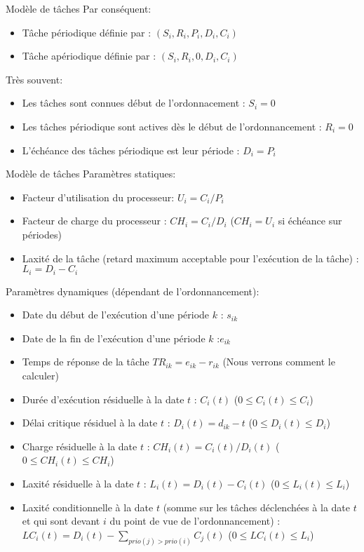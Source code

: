 \begin{frame}{Modèle de tâches}
  Par conséquent: 
  \begin{itemize} 
  \item Tâche périodique définie par : $(S_i, R_i, P_i ,D_i, C_i)$
  \item Tâche apériodique définie par : $(S_i, R_i, 0, D_i, C_i)$
  \end{itemize} 
  Très souvent:
  \begin{itemize}
    \item Les tâches sont connues début de l'ordonnacement : $S_i = 0$
    \item Les tâches périodique sont actives dès le début de
      l'ordonnancement : $R_i = 0$
    \item L'échéance des  tâches périodique est leur période  : $D_i =
      P_i$
  \end{itemize}
\end{frame}

\begin{frame}{Modèle de tâches}
  Paramètres statiques:
  \begin{itemize} 
  \item Facteur d'utilisation du processeur: $U_i =  C_i /P_i$
  \item Facteur de charge du processeur : $CH_i = C_i / D_i $ ($CH_i =
    U_i$ si échéance sur périodes)
  \item Laxité de la tâche (retard maximum acceptable pour l'exécution
    de la tâche) : $L_i = D_i - C_i$
  \end{itemize} 
  Paramètres dynamiques (dépendant de l'ordonnancement):
  \begin{itemize} 
  \item Date du début de l'exécution d'une période $k$ : $s_{ik}$
  \item Date de la fin de l'exécution d'une période $k$ :$e_{ik}$
  \item Temps de réponse de la tâche $TR_{ik} = e_{ik} - r_{ik}$ (Nous
    verrons comment le calculer)
  \item Durée d'exécution résiduelle à la date $t$ : $C_i(t)$ ($0 \leq
    C_i(t) \leq C_i$)
  \item Délai  critique résiduel à la  date $t$ :  $D_i(t) = d_{ik}-t$
    ($0 \leq D_i(t) \leq D_i$)
  \item Charge résiduelle à la date $t$ :
    $CH_i(t) = C_i(t) / D_i(t)$  ($0 \leq CH_i(t) \leq CH_i$)
  \item Laxité  résiduelle à la  date $t$ :
    $L_i(t) = D_i(t) - C_i(t)$  ($0  \leq L_i(t) \leq  L_i$)
  \item  Laxité conditionnelle  à la  date $t$  (somme sur  les tâches
    déclenchées à la  date $t$ et qui sont devant $i$  du point de vue
    de  l'ordonnancement)  :  $LC_i(t)  =  D_i(t)  -  \sum_{prio(j)  >
      prio(i)} C_j(t)$ ($0 \leq LC_i(t) \leq L_i$)
  \end{itemize} 
\end{frame}

